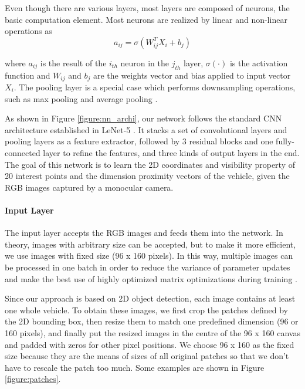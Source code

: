 \documentclass[a4paper,12pt]{article}
\begin{document}
Even though there are various layers, most layers  are composed of neurons, the basic computation element. Most neurons are realized by linear and non-linear operations as 
\begin{equation}
a_{ij} = \sigma(W_{ij}^T X_i +b_j)
\end{equation}

where $a_{ij}$ is the result of the $i_{th}$ neuron in the $j_{th}$ layer, $\sigma(\cdot)$ is the activation function and $W_{ij}$ and $b_j$ are the weights vector and bias applied to input vector $X_i$.  The pooling layer is a special case which performs downsampling operations, such as max pooling \cite{Boureau:2010} and average pooling \cite{6460871}.

As shown in Figure \ref{figure:nn_archi}, our network follows the standard CNN architecture established in LeNet-5 \cite{726791}. It stacks a set of convolutional layers and pooling layers as a feature extractor, followed by 3 residual blocks and one fully-connected layer to refine the features, and three kinds of output layers in the end. The goal of this network is to learn the 2D coordinates and visibility property of 20 interest points and the dimension proximity vectors of the vehicle, given the RGB images captured by a monocular camera.

\paragraph{Input Layer}
The input layer accepts the RGB images and feeds them into the network. In theory, images with arbitrary size can be accepted, but to make it more efficient, we use images with fixed size (96 x 160 pixels).  In this way, multiple images can be processed in one batch in order to reduce the variance of parameter updates and make the best use of highly optimized matrix optimizations during training \cite{DBLP:journals/corr/Ruder16}.

Since our approach is based on 2D object detection, each image contains at least one whole vehicle. To obtain these images, we first crop the patches defined by the 2D bounding box, then resize them to match one predefined dimension (96 or 160 pixels), and finally put the resized images in the centre of the 96 x 160 canvas and padded with zeros for other pixel positions. We choose 96 x 160 as the fixed size because they are the means of sizes of all original patches so that we don't have to rescale the patch too much.  Some examples are shown in Figure \ref{figure:patches}.
\end{document}
